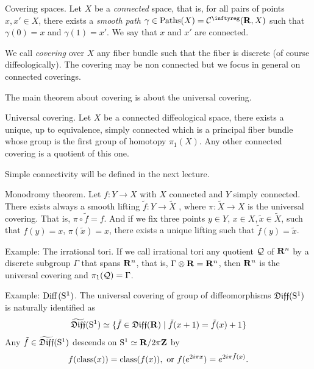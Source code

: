 \begin{Article}{Covering spaces.}{}
  Let $X$ be a \emph{connected} space,
  that is,
  for all pairs of points $x,x' \in X$,
  there exists a \emph{smooth path} $\gamma \in \Paths(X) = \Cinfty(\RR, X)$ such that $\gamma(0) = x$ and $\gamma(1) = x'$.
  We say that $x$ and $x'$ are connected.

  We call \emph{covering} over $X$ any fiber bundle such that the fiber is discrete (of course diffeologically).
  The covering may be non connected but we focus in general on connected coverings.

  The main theorem about covering is about the universal covering.
\end{Article}

\begin{Article}{Universal covering.}{}
  Let $X$ be a connected diffeological space,
  there exists a unique,
  up to equivalence,
  simply connected which is a principal fiber bundle whose group is the first group of homotopy $\pi_1(X)$.
  Any other connected covering is a quotient of this one.

  Simple connectivity will be defined in the next lecture.
\end{Article}

\begin{Article}{Monodromy theorem.}{}
  Let $f \colon Y \to X$ with $X$ connected and $Y$ simply connected.
  There exists always a smooth lifting $\tilde f \colon Y \to \tilde X$ ,
  where $\pi \colon \tilde X \to X$ is the universal covering.
  That is,
  $\pi \circ \tilde f = f$.
  And if we fix three points $y \in Y$,
  $x \in X,
  \tilde x \in \tilde X$,
  such that $f(y) = x$,
  $\pi(\tilde x) = x$,
  there exists a unique lifting such that $\tilde f(y) = \tilde x$.
\end{Article}

\begin{Article}{Example: The irrational tori.}{}
  If we call irrational tori any quotient $\mathcal{Q}$ of $\mathbf{R}^n$ by a discrete subgroup $\Gamma$ that spans $\mathbf{R}^n$,
  that is,
  $\Gamma \otimes \mathbf{R} = \mathbf{R}^n$,
  then $\mathbf{R}^n$ is the universal covering and $\pi_1(\mathcal{Q}) = \Gamma$.
\end{Article}

\begin{Article}{Example: $\bf \text{Diff}\,(\mathrm{S}^1)$.}{}
  The universal covering of group of diffeomorphisms $\mathfrak{Diff}(\mathrm{S}^1)$ is naturally identified as
  $$%
    \widetilde\Diff(\Sph^1) \simeq \{ \tilde f \in \Diff(\RR) \mid \tilde f(x+1) = \tilde f(x) + 1 \}
  $$%
  Any $\tilde f \in \widetilde{\mathfrak{Diff}}(\mathrm{S}^1)$ descends on $\mathrm{S}^1 \simeq \mathbf{R}/2 \pi \mathbf{Z}$ by
  $$%
    f(\Class(x)) = \Class(f(x)),
    \SpacedText{or}
    f(e^{2i\pi x}) = e^{2 i \pi \tilde f(x)}.
  $$%
\end{Article}

